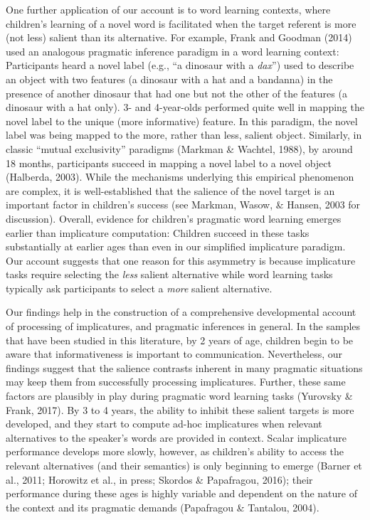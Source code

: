 \documentclass[man]{apa6}
\theoremstyle{definition}
\theoremstyle{definition}
\theoremstyle{definition}
\theoremstyle{remark}
\begin{document}
One further application of our account is to word learning contexts,
where children's learning of a novel word is facilitated when the target
referent is more (not less) salient than its alternative. For example,
Frank and Goodman (2014) used an analogous pragmatic inference paradigm
in a word learning context: Participants heard a novel label (e.g.,
\enquote{a dinosaur with a \emph{dax}}) used to describe an object with
two features (a dinosaur with a hat and a bandanna) in the presence of
another dinosaur that had one but not the other of the features (a
dinosaur with a hat only). 3- and 4-year-olds performed quite well in
mapping the novel label to the unique (more informative) feature. In
this paradigm, the novel label was being mapped to the more, rather than
less, salient object. Similarly, in classic \enquote{mutual exclusivity}
paradigms (Markman \& Wachtel, 1988), by around 18 months, participants
succeed in mapping a novel label to a novel object (Halberda, 2003).
While the mechanisms underlying this empirical phenomenon are complex,
it is well-established that the salience of the novel target is an
important factor in children's success (see Markman, Wasow, \& Hansen,
2003 for discussion). Overall, evidence for children's pragmatic word
learning emerges earlier than implicature computation: Children succeed
in these tasks substantially at earlier ages than even in our simplified
implicature paradigm. Our account suggests that one reason for this
asymmetry is because implicature tasks require selecting the \emph{less}
salient alternative while word learning tasks typically ask participants
to select a \emph{more} salient alternative.

Our findings help in the construction of a comprehensive developmental
account of processing of implicatures, and pragmatic inferences in
general. In the samples that have been studied in this literature, by 2
years of age, children begin to be aware that informativeness is
important to communication. Nevertheless, our findings suggest that the
salience contrasts inherent in many pragmatic situations may keep them
from successfully processing implicatures. Further, these same factors
are plausibly in play during pragmatic word learning tasks (Yurovsky \&
Frank, 2017). By 3 to 4 years, the ability to inhibit these salient
targets is more developed, and they start to compute ad-hoc implicatures
when relevant alternatives to the speaker's words are provided in
context. Scalar implicature performance develops more slowly, however,
as children's ability to access the relevant alternatives (and their
semantics) is only beginning to emerge (Barner et al., 2011; Horowitz et
al., in press; Skordos \& Papafragou, 2016); their performance during
these ages is highly variable and dependent on the nature of the context
and its pragmatic demands (Papafragou \& Tantalou, 2004).
\end{document}
